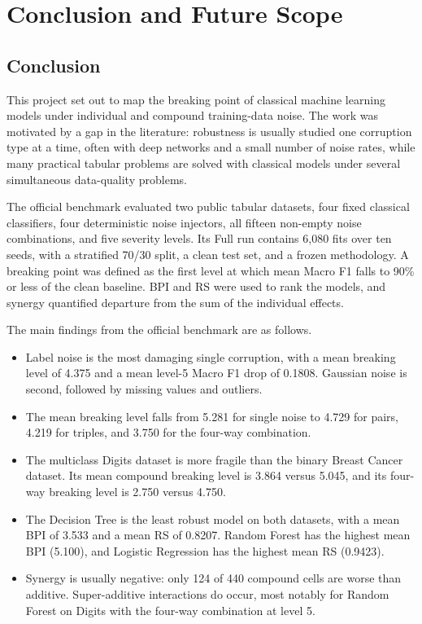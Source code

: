 \chapter{Conclusion and Future Scope}

\section{Conclusion}

This project set out to map the breaking point of classical machine learning models under individual and compound training-data noise. The work was motivated by a gap in the literature: robustness is usually studied one corruption type at a time, often with deep networks and a small number of noise rates, while many practical tabular problems are solved with classical models under several simultaneous data-quality problems.

The official benchmark evaluated two public tabular datasets, four fixed classical classifiers, four deterministic noise injectors, all fifteen non-empty noise combinations, and five severity levels. Its Full run contains 6,080 fits over ten seeds, with a stratified 70/30 split, a clean test set, and a frozen methodology. A breaking point was defined as the first level at which mean Macro F1 falls to 90\% or less of the clean baseline. BPI and RS were used to rank the models, and synergy quantified departure from the sum of the individual effects.

The main findings from the official benchmark are as follows.

\begin{itemize}
  \item Label noise is the most damaging single corruption, with a mean breaking level of 4.375 and a mean level-5 Macro F1 drop of 0.1808. Gaussian noise is second, followed by missing values and outliers.
  \item The mean breaking level falls from 5.281 for single noise to 4.729 for pairs, 4.219 for triples, and 3.750 for the four-way combination.
  \item The multiclass Digits dataset is more fragile than the binary Breast Cancer dataset. Its mean compound breaking level is 3.864 versus 5.045, and its four-way breaking level is 2.750 versus 4.750.
  \item The Decision Tree is the least robust model on both datasets, with a mean BPI of 3.533 and a mean RS of 0.8207. Random Forest has the highest mean BPI (5.100), and Logistic Regression has the highest mean RS (0.9423).
  \item Synergy is usually negative: only 124 of 440 compound cells are worse than additive. Super-additive interactions do occur, most notably for Random Forest on Digits with the four-way combination at level 5.
\end{itemize}


